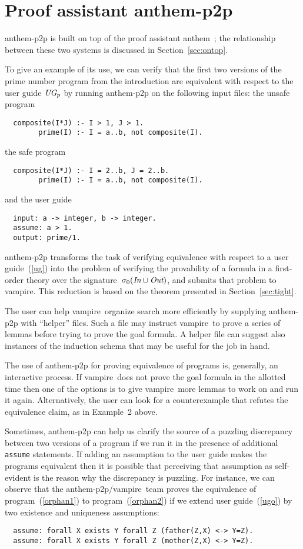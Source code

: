 \documentclass{new_tlp}
\def\anthem{{\sc anthem}}
\def\vampire{{\sc vampire}}
\begin{document}
\section{Proof assistant {\sc anthem-p2p}}

{\sc anthem-p2p} is built on top of the proof assistant \anthem\
\cite{fan20}; the relationship between these two systems is discussed in
Section~\ref{sec:ontop}.

To give an example of its use,
we can verify that the first two versions of the prime number program
from the introduction are equivalent with respect to the user guide
$\emph{UG}_p$ by running {\sc anthem-p2p} on the following input files: the
unsafe program
\begin{verbatim}
  composite(I*J) :- I > 1, J > 1.
        prime(I) :- I = a..b, not composite(I).
\end{verbatim}
the safe program
\begin{verbatim}
  composite(I*J) :- I = 2..b, J = 2..b.
        prime(I) :- I = a..b, not composite(I).
\end{verbatim}
and the user guide
\begin{verbatim}
  input: a -> integer, b -> integer.
  assume: a > 1.
  output: prime/1.
\end{verbatim}
{\sc anthem-p2p} transforms the task of verifying equivalence
with respect to a user guide~(\ref{ug}) into the problem of verifying
the provability of a formula in a first-order theory over the
signature~$\sigma_0(\emph{In}\cup\emph{Out})$,
and submits that problem to \vampire.  This reduction is based on the theorem
presented in Section~\ref{sec:tight}.

The user can help \vampire\ organize search more efficiently by
supplying {\sc anthem-p2p} with ``helper'' files.  Such a file may instruct
\vampire\ to prove a series of lemmas before trying to prove the goal formula.
A helper file can suggest also instances of the induction schema that may be
useful for the job in hand.

The use of {\sc anthem-p2p} for proving
equivalence of programs is, generally, an interactive process.
If \vampire\ does not prove the goal formula in the allotted time then one of
the options is to give \vampire\ more lemmas to work on and run it
again.  Alternatively, the user can look for a counterexample that refutes the
equivalence claim, as in Example~2 above.

Sometimes, {\sc anthem-p2p} can 
help us clarify the source of a puzzling discrepancy between two versions
of a program if we run it in the presence of additional \verb|assume|
statements.  If
adding an assumption to the user guide makes the programs equivalent then
it is possible that perceiving that assumption as self-evident
is the reason why the discrepancy is puzzling.  For
instance, we can observe that
the {\sc anthem-p2p}/\vampire\ team
proves the equivalence of
program~(\ref{orphan1}) to program~(\ref{orphan2}) if we extend user
guide~(\ref{ugo}) by two existence and uniqueness assumptions:
\begin{verbatim}
  assume: forall X exists Y forall Z (father(Z,X) <-> Y=Z).
  assume: forall X exists Y forall Z (mother(Z,X) <-> Y=Z).
\end{verbatim}
\end{document}
